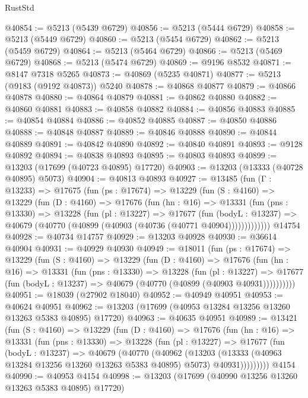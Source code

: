 \begin{lexlean}{RustStd}
\begin{coremodule}
@40854 := @5213 (@5439 @6729)
@40856 := @5213 (@5444 @6729)
@40858 := @5213 (@5449 @6729)
@40860 := @5213 (@5454 @6729)
@40862 := @5213 (@5459 @6729)
@40864 := @5213 (@5464 @6729)
@40866 := @5213 (@5469 @6729)
@40868 := @5213 (@5474 @6729)
@40869 := @9196 @8532
@40871 := @8147 @7318 @5265
@40873 := @40869 (@5235 @40871)
@40877 := @5213 (@9183 (@9192 @40873)) @5240
@40878 := @40868 @40877
@40879 := @40866 @40878
@40880 := @40864 @40879
@40881 := @40862 @40880
@40882 := @40860 @40881
@40883 := @40858 @40882
@40884 := @40856 @40883
@40885 := @40854 @40884
@40886 := @40852 @40885
@40887 := @40850 @40886
@40888 := @40848 @40887
@40889 := @40846 @40888
@40890 := @40844 @40889
@40891 := @40842 @40890
@40892 := @40840 @40891
@40893 := @9128 @40892
@40894 := @40838 @40893
@40895 := @40803 @40893
@40899 := @13203 (@17699 (@40723 @40895) @17720)
@40903 := @13203 (@13333 (@40728 @40895) @5073)
@40904 := @40813 @40893
@40927 := @13485
    (fun (Γ : @13233) =>
    @17675
      (fun (ps : @17674) =>
      @13229
        (fun (S : @4160) =>
        @13229
          (fun (D : @4160) =>
          @17676
            (fun (hn : @16) =>
            @13331
              (fun (pns : @13330) =>
              @13228
                (fun (pl : @13227) =>
                @17677
                  (fun (bodyL : @13237) =>
                  @40679 (@40770 (@40899 (@40903 (@40736 (@40771 @40904)))))))))))))
    @14754
@40928 := @40734 @14757
@40929 := @13203 @40928
@40930 := @36614 @40904
@40931 := @40929 @40930
@40949 := @18011
    (fun (ps : @17674) =>
    @13229
      (fun (S : @4160) =>
      @13229
        (fun (D : @4160) =>
        @17676
          (fun (hn : @16) =>
          @13331
            (fun (pns : @13330) =>
            @13228
              (fun (pl : @13227) =>
              @17677 (fun (bodyL : @13237) => @40679 (@40770 (@40899 (@40903 @40931))))))))))
@40951 := @18039 (@27902 @18040)
@40952 := @40949 @40951
@40953 := @40624 @40951
@40962 := @13203 (@17699 (@40953 @13284 @13256 @13260 @13263 @5383 @40895) @17720)
@40963 := @40635 @40951
@40989 := @13421
    (fun (S : @4160) =>
    @13229
      (fun (D : @4160) =>
      @17676
        (fun (hn : @16) =>
        @13331
          (fun (pns : @13330) =>
          @13228
            (fun (pl : @13227) =>
            @17677
              (fun (bodyL : @13237) =>
              @40679
                (@40770
                  (@40962
                    (@13203
                      (@13333 (@40963 @13284 @13256 @13260 @13263 @5383 @40895) @5073)
                      @40931)))))))))
    @4154
@40990 := @40953 @4154
@40998 := @13203 (@17699 (@40990 @13256 @13260 @13263 @5383 @40895) @17720)

\end{coremodule}
\end{lexlean}

